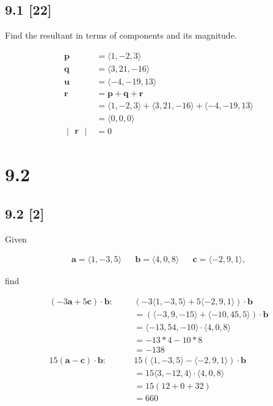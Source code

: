 \documentclass{article}
\begin{document}
\subsection*{9.1 [22]}
\setcounter{equation}{0}

Find the resultant in terms of components and its magnitude.

\begin{align}
       \textbf{p} &= \langle1, -2, 3\rangle
    \\ \textbf{q} &= \langle3, 21, -16\rangle
    \\ \textbf{u} &= \langle-4, -19, 13\rangle
    \\ \textbf{r} &= \textbf{p} + \textbf{q} + \textbf{r}
    \\            &= \langle1, -2, 3\rangle + \langle3, 21, -16\rangle + \langle-4, -19, 13\rangle
    \\ &= \langle0, 0, 0\rangle
    \\
    \begin{vmatrix} \textbf{r}
    \end{vmatrix} &= 0
\end{align}

\newpage

\section*{9.2}

\subsection*{9.2 [2]}
\setcounter{equation}{0}

Given

\begin{align}
    \textbf{a} = \langle1, -3, 5\rangle && \textbf{b} = \langle4, 0, 8\rangle && \textbf{c} = \langle-2, 9, 1\rangle,
\end{align}

find

\begin{align}
    (-3\textbf{a}+5\textbf{c})\cdot\textbf{b}: && &\text{}
    (-3\langle1, -3, 5\rangle + 5\langle-2, 9, 1\rangle) \cdot \textbf{b}
    \\
    && &= (\langle-3, 9, -15\rangle + \langle-10, 45, 5\rangle) \cdot \textbf{b}
    \\
    && &= \langle-13, 54, -10\rangle \cdot \langle4, 0, 8\rangle
    \\
    && &= -13*4-10*8
    \\
    && &= -138
    \\
    15(\textbf{a}-\textbf{c}) \cdot \textbf{b}: && &\text{}
    15(\langle1, -3, 5\rangle - \langle-2, 9, 1\rangle) \cdot \textbf{b}
    \\
    && &= 15\langle3, -12, 4\rangle\cdot\langle4, 0, 8\rangle
    \\
    && &= 15(12+0+32)
    \\
    && &= 660
\end{align}
\end{document}
